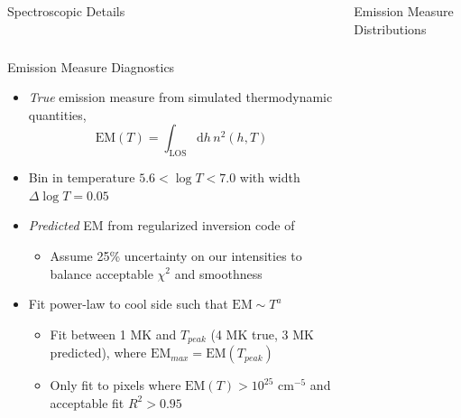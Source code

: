\documentclass[final]{beamer}
\begin{document}
\begin{frame}
\begin{columns}[T]
\begin{column}{0.49\linewidth}
\begin{block}{Spectroscopic Details}
\begin{columns}[T]
\begin{column}{0.49\columnwidth}
\begin{figure}
          \end{figure}
        \end{column}
        \begin{column}{0.49\columnwidth}
        
        \end{column}
      \end{columns}
    \end{block}
    \begin{block}{Emission Measure Diagnostics}
      \begin{itemize}
        \item \textit{True} emission measure from simulated thermodynamic quantities,
              \begin{equation*}
                \mathrm{EM}(T) = \int_{\mathrm{LOS}}\mathrm{d}h\,n^2(h,T)
              \end{equation*} 
        \item Bin in temperature $5.6<\log{T}<7.0$ with width $\Delta\log{T}=0.05$
        \item \textit{Predicted} EM from regularized inversion code of \citet{hannah_differential_2012}
        \begin{itemize}
          \item Assume 25\% uncertainty on our intensities to balance acceptable $\chi^2$ and smoothness
        \end{itemize}
        \item Fit power-law to cool side such that $\mathrm{EM}\sim T^a$
        \begin{itemize}
          \item Fit between 1 MK and $T_{peak}$ (4 MK true, 3 MK predicted), where $\mathrm{EM}_{max}=\mathrm{EM}(T_{peak})$
          \item Only fit to pixels where $\mathrm{EM}(T)>10^{25}\,\,\mathrm{cm}^{-5}$ and acceptable fit $R^2>0.95$
        \end{itemize}
      \end{itemize}
    \end{block}
  \end{column}
  \begin{column}{0.49\linewidth}
    \begin{block}{Emission Measure Distributions}
      \begin{itemize}

\end{itemize}
\end{block}
\end{column}
\end{columns}
\end{frame}
\end{document}
